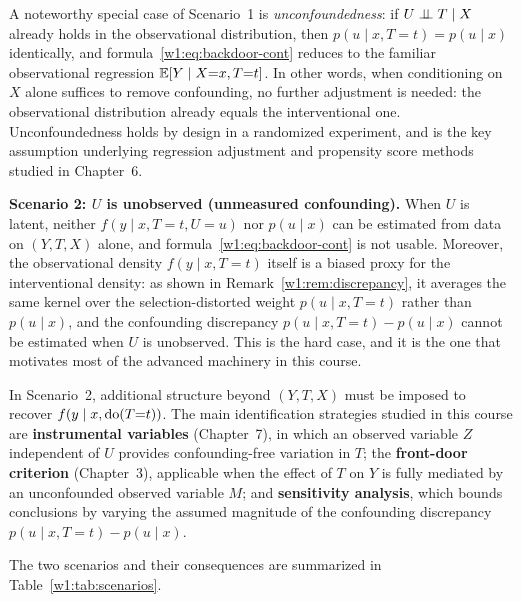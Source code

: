 \documentclass[master.tex]{subfiles}
\begin{document}
A noteworthy special case of Scenario~1 is \emph{unconfoundedness}:
if $U \perp\!\!\!\perp T \mid X$ already holds in the observational distribution,
then $p(u \mid x, T{=}t) = p(u \mid x)$ identically, and
formula~\eqref{w1:eq:backdoor-cont} reduces to the familiar observational
regression $\mathbb{E}[Y \mid X{=}x, T{=}t]$.  In other words, when conditioning
on $X$ alone suffices to remove confounding, no further adjustment is
needed: the observational distribution already equals the interventional
one.  Unconfoundedness holds by design in a randomized experiment, and
is the key assumption underlying regression adjustment and propensity
score methods studied in Chapter~6.

\medskip
\noindent\textbf{Scenario 2: $U$ is unobserved (unmeasured confounding).}
When $U$ is latent, neither $f(y \mid x, T{=}t, U{=}u)$ nor $p(u \mid x)$
can be estimated from data on $(Y, T, X)$ alone, and
formula~\eqref{w1:eq:backdoor-cont} is not usable.  Moreover, the
observational density $f(y \mid x, T{=}t)$ itself is a biased proxy for
the interventional density: as shown in Remark~\ref{w1:rem:discrepancy},
it averages the same kernel over the selection-distorted weight
$p(u \mid x, T{=}t)$ rather than $p(u \mid x)$, and the confounding
discrepancy $p(u \mid x, T{=}t) - p(u \mid x)$ cannot be estimated when
$U$ is unobserved.  This is the hard case, and it is the one that motivates
most of the advanced machinery in this course.

In Scenario~2, additional structure beyond $(Y, T, X)$ must be imposed to
recover $f(y \mid x, \mathrm{do}(T{=}t))$.  The main identification strategies
studied in this course are \textbf{instrumental variables} (Chapter~7),
in which an observed variable $Z$ independent of $U$ provides
confounding-free variation in $T$; the \textbf{front-door criterion}
(Chapter~3), applicable when the effect of $T$ on $Y$ is fully mediated
by an unconfounded observed variable $M$; and \textbf{sensitivity
analysis}, which bounds conclusions by varying the assumed magnitude of
the confounding discrepancy $p(u \mid x, T{=}t) - p(u \mid x)$.

\noindent The two scenarios and their consequences are summarized in
Table~\ref{w1:tab:scenarios}.
\end{document}
